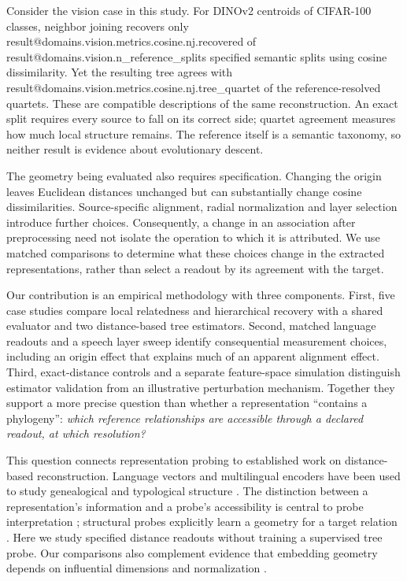 \documentclass[mlmain]{jmlr}
\makeatletter
\newcommand{\Result}[1]{\csname result@#1\endcsname}
\makeatother
\begin{document}
Consider the vision case in this study. For DINOv2 centroids of CIFAR-100 classes, neighbor joining
recovers only \Result{domains.vision.metrics.cosine.nj.recovered} of
\Result{domains.vision.n_reference_splits} specified semantic splits using cosine dissimilarity.
Yet the resulting tree agrees with
\Result{domains.vision.metrics.cosine.nj.tree_quartet} of the reference-resolved quartets.
These are compatible descriptions of the same reconstruction. An exact split requires every
source to fall on its correct side; quartet agreement measures how much local structure remains.
The reference itself is a semantic taxonomy, so neither result is evidence about evolutionary
descent.

The geometry being evaluated also requires specification. Changing the origin leaves Euclidean
distances unchanged but can substantially change cosine dissimilarities. Source-specific
alignment, radial normalization and layer selection introduce further choices. Consequently, a
change in an association after preprocessing need not isolate the operation to which it is
attributed. We use matched comparisons to determine what these choices change in the extracted
representations, rather than select a readout by its agreement with the target.

Our contribution is an empirical methodology with three components. First, five case studies
compare local relatedness and hierarchical recovery with a shared evaluator and two distance-based
tree estimators. Second, matched language readouts and a speech layer sweep identify consequential
measurement choices, including an origin effect that explains much of an apparent alignment effect.
Third, exact-distance controls and a separate feature-space simulation distinguish estimator
validation from an illustrative perturbation mechanism. Together they support a more precise
question than whether a representation ``contains a phylogeny'': \emph{which reference relationships
are accessible through a declared readout, at which resolution?}

This question connects representation probing to established work on distance-based reconstruction.
Language vectors and multilingual encoders have been used to study genealogical and typological
structure \citep{ostling-tiedemann-2017-continuous,bjerva-etal-2019-language,rama-etal-2020-probing}.
The distinction between a representation's information and a probe's accessibility is central to
probe interpretation \citep{hewitt-liang-2019-designing,pimentel-etal-2020-information}; structural
probes explicitly learn a geometry for a target relation \citep{hewitt-manning-2019-structural}.
Here we study specified distance readouts without training a supervised tree probe. Our comparisons
also complement evidence that embedding geometry depends on influential dimensions and
normalization \citep{timkey-van-schijndel-2021-bark}.
\end{document}
